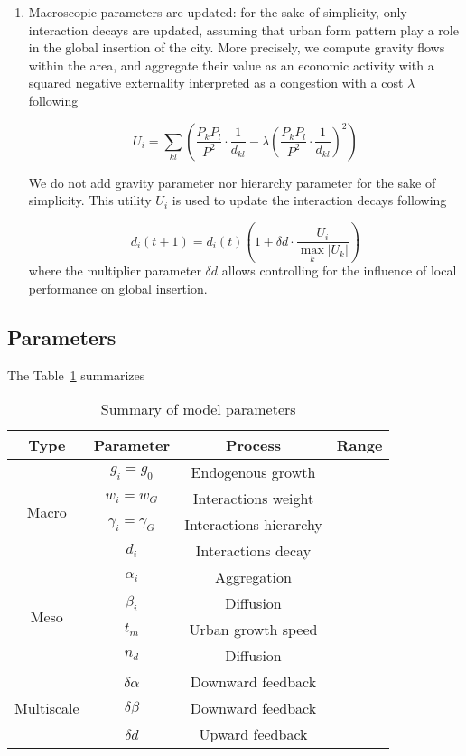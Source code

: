 \documentclass[11pt]{article}
\begin{document}
\begin{enumerate}
	\item Macroscopic parameters are updated: for the sake of simplicity, only interaction decays are updated, assuming that urban form pattern play a role in the global insertion of the city. More precisely, we compute gravity flows within the area, and aggregate their value as an economic activity with a squared negative externality interpreted as a congestion with a cost $\lambda$ following
	
	\begin{equation}
		U_i = \sum_{kl} \left( \frac{P_k P_l}{P^2} \cdot \frac{1}{d_{kl}} - \lambda \left(\frac{P_k P_l}{P^2} \cdot \frac{1}{d_{kl}}\right)^2 \right)
	\end{equation}
	
	We do not add gravity parameter nor hierarchy parameter for the sake of simplicity. This utility $U_i$ is used to update the interaction decays following
	
	\begin{equation}
		d_i (t+1) = d_i (t) \left( 1 + \delta d \cdot \frac{U_i}{\max_k \left|U_k\right|} \right)
	\end{equation}
	where the multiplier parameter $\delta d$ allows controlling for the influence of local performance on global insertion.
\end{enumerate}





\subsection{Parameters}

The Table~\ref{tab:parameters} summarizes

\begin{table}
	\caption{Summary of model parameters\label{tab:parameters}}
	\centering
	\begin{tabular}{|c|c|c|c|}
	\hline
		Type & Parameter & Process & Range \\\hline
		\multirow{4}{*}{Macro} & $g_i = g_0$ & Endogenous growth & \\
		& $w_i = w_G$ & Interactions weight & \\
		& $\gamma_i = \gamma_G$ & Interactions hierarchy & \\
		& $d_i$ & Interactions decay & \\ \hline
		\multirow{4}{*}{Meso} & $\alpha_i$ & Aggregation & \\
		& $\beta_i$ & Diffusion & \\
		& $t_m$ & Urban growth speed & \\
		& $n_d$ & Diffusion & \\ \hline
		\multirow{3}{*}{Multiscale} & $\delta\alpha$ & Downward feedback & \\
		& $\delta\beta$ & Downward feedback & \\
		& $\delta d$ & Upward feedback & \\\hline
	\end{tabular}
\end{table}
\end{document}
